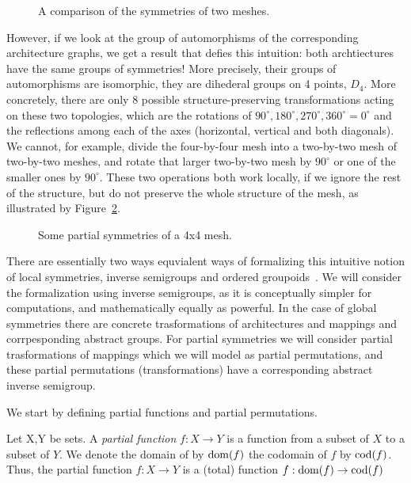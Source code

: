 \begin{figure}[h]
	\centering
   \resizebox{0.55\textwidth}{!}{}
	\caption{A comparison of the symmetries of two meshes.}
	\label{fig:motivation_partial_symmetries}
\end{figure}

However, if we look at the group of automorphisms of the corresponding architecture graphs, we get a result that defies this intuition:
both archtiectures have the same groups of symmetries!
More precisely, their groups of automorphisms are isomorphic, they are dihederal groups on 4 points, $D_4$.
More concretely, there are only 8  possible structure-preserving transformations acting on these two topologies, which are the rotations of $90^\circ,180^\circ,270^\circ,360^\circ = 0^\circ$ and the reflections among each of the axes (horizontal, vertical and both diagonals). We cannot, for example, divide the four-by-four mesh into a two-by-two mesh of two-by-two meshes, and rotate that larger two-by-two mesh by $90^\circ$ or one of the smaller ones by $90^\circ$. These two operations both work locally, if we ignore the rest of the structure, but do not preserve the whole structure of the mesh, as illustrated by Figure~\ref{fig:partial_symmetries_4x4}.

\begin{figure}[h]
	\centering
   \resizebox{0.55\textwidth}{!}{}
	\caption{Some partial symmetries of a 4x4 mesh.}
	\label{fig:partial_symmetries_4x4}
\end{figure}

There are essentially two ways equvialent ways of formalizing this intuitive notion of local symmetries, inverse semigroups and ordered groupoids~\cite{lawson_inverse_semigroups}.
We will consider the formalization using inverse semigroups, as it is conceptually simpler for computations, and mathematically equally as powerful.
In the case of global symmetries there are concrete trasformations of architectures and mappings and corrpesponding abstract groups. For partial symmetries we will consider partial trasformations of mappings which we will model as partial permutations, and these partial permutations (transformations) have a corresponding abstract inverse semigroup.

We start by defining partial functions and partial permutations.
\begin{defn}
Let X,Y be sets.
A \emph{partial function} $f: X \rightarrow Y$ is a function from a subset of $X$ to a subset of $Y$.
We denote the domain of by $\operatorname{dom}(f)$ the codomain of $f$ by $\operatorname{cod}(f)$.
Thus, the partial function $f: X \rightarrow Y$ is a (total) function $f: \operatorname{dom}(f) \rightarrow \operatorname{cod}(f)$
\end{defn}

